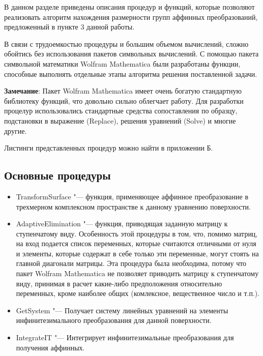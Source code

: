 \documentclass[../main.tex]{subfiles}
\begin{document}
В данном разделе приведены описания процедур и функций, которые позволяют реализовать алгоритм нахождения размерности групп аффинных преобразований, предложенный в пункте 3 данной работы. 

В связи с трудоемкостью процедуры и большим объемом вычислений, сложно обойтись без использования пакетов символьных вычислений. С помощью пакета символьной математики {\ttfamily Wolfram Mathematica} были разработаны функции, способные выполнять отдельные этапы алгоритма решения поставленной задачи.

\textbf{Замечание}: Пакет {\ttfamily Wolfram Mathematica} имеет очень богатую стандартную библиотеку функций, что довольно сильно облегчает работу. Для разработки процелур использовались стандартные средства сопоставления по образцу, подстановки в выражение ({\ttfamily Replace}), решения уравнений ({\ttfamily Solve}) и многие другие.

Листинги представленных процедур можно найти в приложении Б.

\subsection{Основные процедуры}

\begin{itemize}

\item {\ttfamily TransformSurface} "--- функция, применяющее аффинное преобразование в трехмерном комплексном пространстве к данному уравнению поверхности. 

\item {\ttfamily AdaptiveElimination} "--- функция, приводящая заданную матрицу к ступенчатому виду. Особенность этой процедуры в том, что, помимо матриц, на вход подается список переменных, которые считаются отличными от нуля и элементы, которые содержат в себе только эти переменные, могут стоять на главной диагонали матрицы. Эта процедура была необходима, потому что пакет {\ttfamily Wolfram Mathematica} не позволяет приводить матрицу к ступенчатому виду, принимая в расчет какие-либо предположения относительно переменных, кроме наиболее общих (комлексное, вещественное число и т.п.).

\item {\ttfamily GetSystem} "---  Получает систему линейных уравнений на элементы инфинитезимального преобразования для данной поверхности.

\item {\ttfamily IntegrateIT} "---  Интегрирует инфинитезимальные преобразования для получения аффинных. 

\end{itemize}
\end{document}
